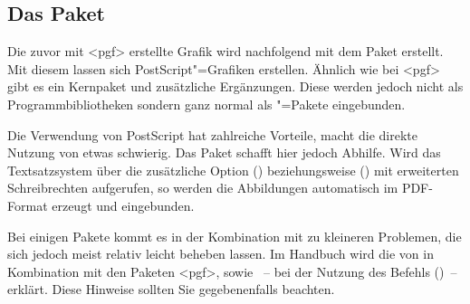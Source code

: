 \documentclass[%
  english,ngerman,%
  cdgeometry=no,DIV=12,automark,%
]{tudscrartcl}
\begin{document}
\subsection{Das Paket }
Die zuvor mit <pgf> erstellte Grafik wird nachfolgend mit dem 
Paket  erstellt. Mit diesem lassen sich PostScript"=Grafiken 
erstellen. Ähnlich wie bei <pgf> gibt es ein Kernpaket und 
zusätzliche Ergänzungen. Diese werden jedoch nicht als Programmbibliotheken 
sondern ganz normal als "=Pakete eingebunden.
%
\begin{Hint}
\usepackage{pstricks,pst-node}
\end{Hint}
%
Die Verwendung von PostScript hat zahlreiche Vorteile, macht die direkte 
Nutzung von  etwas schwierig. Das Paket  
schafft hier jedoch Abhilfe. Wird das Textsatzsystem  über die 
zusätzliche Option () beziehungsweise 
() mit erweiterten Schreibrechten 
aufgerufen, so werden die Abbildungen automatisch im PDF-Format erzeugt und 
eingebunden.
%
\begin{Hint}
\usepackage{auto-pst-pdf}
\end{Hint}
%
Bei einigen Pakete kommt es in der Kombination mit  zu 
kleineren Problemen, die sich jedoch meist relativ leicht beheben lassen. Im 
Handbuch wird die  
von  in Kombination mit den Paketen <pgf>, 
 sowie ~-- bei der Nutzung des Befehls 
()~-- erklärt. Diese Hinweise sollten Sie 
gegebenenfalls beachten.
\end{document}
